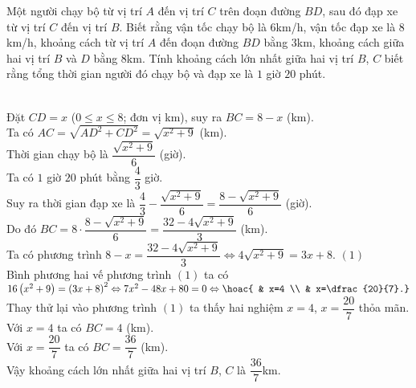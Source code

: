 \begin{bt}%
\immini
{
Một người chạy bộ từ vị trí $A$ đến vị trí $C$ trên đoạn đường $BD$, sau đó đạp xe từ vị trí $C$ đến vị trí $B$. Biết rằng vận tốc chạy bộ là $6$km/h, vận tốc đạp xe là $8$km/h, khoảng cách từ vị trí $A$ đến đoạn đường $BD$ bằng $3$km, khoảng cách giữa hai vị trí $B$ và $D$ bằng $8$km. Tính khoảng cách lớn nhất giữa hai vị trí $B$, $C$ biết rằng tổng thời gian người đó chạy bộ và đạp xe là $1$ giờ $20$ phút.
}
{
}
\loigiai
{\\
Đặt $CD=x$ ($0\leqslant x\leqslant8$; đơn vị km), suy ra $BC=8-x$ (km). \\
Ta có $AC=\sqrt{AD^2+CD^2}=\sqrt{x^2+9}$ (km). \\
Thời gian chạy bộ là $\dfrac{\sqrt{x^2+9}}{6}$ (giờ). \\
Ta có $1$ giờ $20$ phút bằng $\dfrac{4}{3}$ giờ. \\
Suy ra thời gian đạp xe là $\dfrac{4}{3}-\dfrac{\sqrt{x^2+9}}{6}=\dfrac{8-\sqrt{x^2+9}}{6}$ (giờ). \\
Do đó $BC=8\cdot\dfrac{8-\sqrt{x^2+9}}{6}=\dfrac{32-4\sqrt{x^2+9}}{3}$ (km). \\
Ta có phương trình $8-x=\dfrac{32-4\sqrt{x^2+9}}{3} \Leftrightarrow 4\sqrt{x^2+9}=3x+8$. \hfill $(1)$ \\
Bình phương hai vế phương trình $(1)$ ta có $16\left(x^2+9\right)=\left(3x+8\right)^2 \Leftrightarrow 7x^2-48x+80=0 \Leftrightarrow \hoac{ & x=4 \\ & x=\dfrac{20}{7}.}$ \\
Thay thử lại vào phương trình $(1)$ ta thấy hai nghiệm $x=4$, $x=\dfrac{20}{7}$ thỏa mãn. \\
Với $x=4$ ta có $BC=4$ (km). \\
Với $x=\dfrac{20}{7}$ ta có $BC=\dfrac{36}{7}$ (km). \\
Vậy khoảng cách lớn nhất giữa hai vị trí $B$, $C$ là $\dfrac{36}{7}$km. \\
}
\end{bt}

